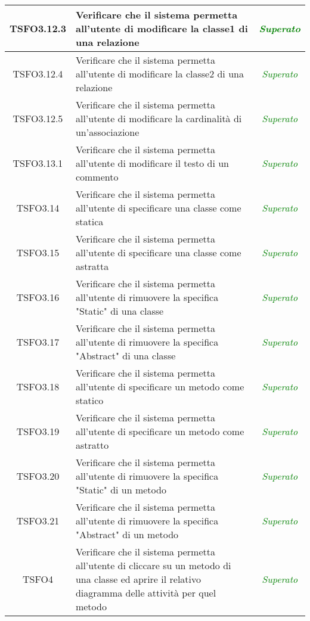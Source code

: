 \begin{longtable}{|c|>{}m{8cm}|c|}
\hypertarget{TSFO3.12.3}{TSFO3.12.3} & Verificare che il sistema permetta all'utente di modificare la classe1 di una relazione & \textcolor{Green}{\textit{Superato}}\\ \hline
\hypertarget{TSFO3.12.4}{TSFO3.12.4} & Verificare che il sistema permetta all'utente di modificare la classe2 di una relazione & \textcolor{Green}{\textit{Superato}}\\ \hline
\hypertarget{TSFO3.12.5}{TSFO3.12.5} & Verificare che il sistema permetta all'utente di modificare la cardinalità di un'associazione & \textcolor{Green}{\textit{Superato}}\\ \hline
\hypertarget{TSFO3.13.1}{TSFO3.13.1} & Verificare che il sistema permetta all'utente di modificare il testo di un commento & \textcolor{Green}{\textit{Superato}}\\ \hline
\hypertarget{TSFO3.14}{TSFO3.14} & Verificare che il sistema permetta all'utente di specificare una classe come statica & \textcolor{Green}{\textit{Superato}}\\ \hline
\hypertarget{TSFO3.15}{TSFO3.15} & Verificare che il sistema permetta all'utente di specificare una classe come astratta & \textcolor{Green}{\textit{Superato}}\\ \hline
\hypertarget{TSFO3.16}{TSFO3.16} & Verificare che il sistema permetta all'utente di rimuovere la specifica "Static" di una classe & \textcolor{Green}{\textit{Superato}}\\ \hline
\hypertarget{TSFO3.17}{TSFO3.17} & Verificare che il sistema permetta all'utente di rimuovere la specifica "Abstract" di una classe & \textcolor{Green}{\textit{Superato}}\\ \hline
\hypertarget{TSFO3.18}{TSFO3.18} & Verificare che il sistema permetta all'utente di specificare un metodo come statico & \textcolor{Green}{\textit{Superato}}\\ \hline
\hypertarget{TSFO3.19}{TSFO3.19} & Verificare che il sistema permetta all'utente di specificare un metodo come astratto & \textcolor{Green}{\textit{Superato}}\\ \hline
\hypertarget{TSFO3.20}{TSFO3.20} & Verificare che il sistema permetta all'utente di rimuovere la specifica "Static" di un metodo & \textcolor{Green}{\textit{Superato}}\\ \hline
\hypertarget{TSFO3.21}{TSFO3.21} & Verificare che il sistema permetta all'utente di rimuovere la specifica "Abstract" di un metodo & \textcolor{Green}{\textit{Superato}}\\ \hline
\hypertarget{TSFO4}{TSFO4} & Verificare che il sistema permetta all'utente di cliccare su un metodo di una classe ed aprire il relativo diagramma delle attività per quel metodo & \textcolor{Green}{\textit{Superato}}\\ \hline

\end{longtable}
